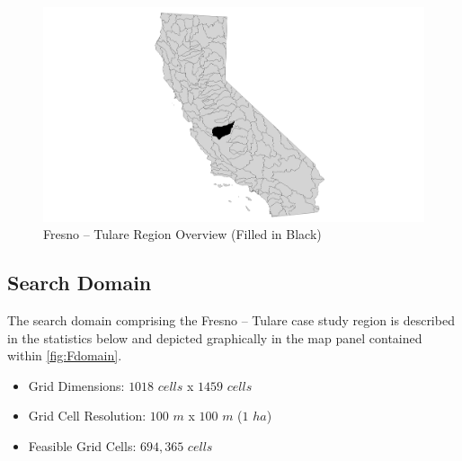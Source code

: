         \begin{figure}[!h]
            \begin{center}
            \includegraphics[width=5.5in]{figures/Fresno_Overview.png}   
            \caption{Fresno -- Tulare Region Overview (Filled in Black)}
            \label{fig:Foverview}
            \end{center}
        \end{figure}

    \subsection{Search Domain}

 The search domain comprising the Fresno -- Tulare case study region is described in the statistics below and depicted graphically in the map panel contained within \ref{fig:Fdomain}.
    
    \begin{itemize}
      \setlength{\itemsep}{0cm}
      \setlength{\parskip}{0cm}
        \item Grid Dimensions: $1018$ $cells$ x $1459$ $cells$
        \item Grid Cell Resolution: $100$ $m$ x $100$ $m$ ($1$ $ha$)
        \item Feasible Grid Cells: $694,365$ $cells$
    \end{itemize}
    
